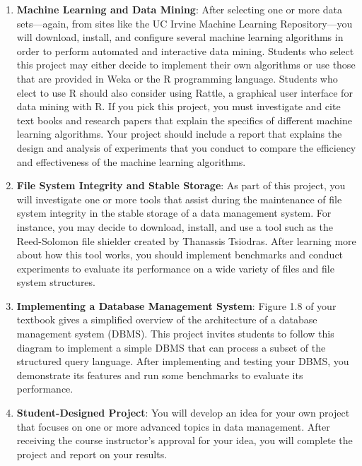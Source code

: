 \begin{enumerate}
  \item {\bf Machine Learning and Data Mining}: After selecting one or more data sets---again, from sites like the UC
    Irvine Machine Learning Repository---you will download, install, and configure several machine learning algorithms
    in order to perform automated and interactive data mining.  Students who select this project may either decide to
    implement their own algorithms or use those that are provided in Weka or the R programming language.  Students who
    elect to use R should also consider using Rattle, a graphical user interface for data mining with R.  If you pick
    this project, you must investigate and cite text books and research papers that explain the specifics of different
    machine learning algorithms.  Your project should include a report that explains the design and analysis of
    experiments that you conduct to compare the efficiency and effectiveness of the machine learning algorithms.  

  \item {\bf File System Integrity and Stable Storage}: As part of this project, you will investigate one or more tools
    that assist during the maintenance of file system integrity in the stable storage of a data management system.  For
    instance, you may decide to download, install, and use a tool such as the Reed-Solomon file shielder created by
    Thanassis Tsiodras.  After learning more about how this tool works, you should implement benchmarks and conduct
    experiments to evaluate its performance on a wide variety of files and file system structures.  

  \item {\bf Implementing a Database Management System}: Figure 1.8 of your textbook gives a simplified overview of the
    architecture of a database management system (DBMS). This project invites students to follow this diagram to
    implement a simple DBMS that can process a subset of the structured query language. After implementing and testing
    your DBMS, you demonstrate its features and run some benchmarks to evaluate its performance.

  \item {\bf Student-Designed Project}: You will develop an idea for your own project that focuses on one or more
    advanced topics in data management. After receiving the course instructor's approval for your idea, you will
    complete the project and report on your results.

\end{enumerate} 

